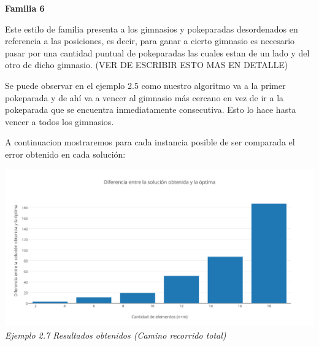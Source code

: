 \begin{center}
\textbf{Familia 6}
\end{center}

Este estilo de familia presenta a los gimnasios y pokeparadas desordenados en referencia a las posiciones, es decir, para ganar a cierto gimnasio es necesario pasar por una cantidad puntual de pokeparadas las cuales estan de un lado y del otro de dicho gimnasio.
(VER DE ESCRIBIR ESTO MAS EN DETALLE)

\begin{figure} [!ht]
 \centering
       \label{fig:jaggies}
    \label{fig:moire}
    \end{figure}

Se puede observar en el ejemplo 2.5 como nuestro algoritmo va a la primer pokeparada y de ah\'i va a vencer al gimnasio m\'as cercano en vez de ir a la pokeparada que se encuentra inmediatamente consecutiva. Esto lo hace hasta vencer a todos los gimnasios.

A continuacion mostraremos para cada instancia posible de ser comparada el error obtenido en cada soluci\'on:

\vspace*{0.3cm} \vspace*{0.3cm}
  \begin{center}
\includegraphics[scale=0.40]{./EJ2/sinOrden.png}
\\{\textit{Ejemplo 2.7 Resultados obtenidos (Camino recorrido total) }}
  \end{center}
  \vspace*{0.3cm}
  
